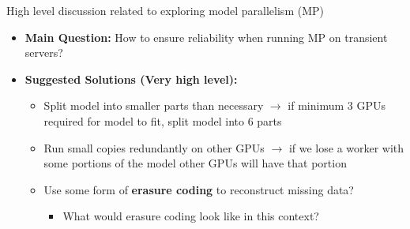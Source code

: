 \vspace{1em}
High level discussion related to exploring model parallelism (MP)
\begin{itemize}
    \item \textbf{Main Question:} How to ensure reliability when running MP on
      transient servers?
    \item \textbf{Suggested Solutions (Very high level):}
    \begin{itemize}
        \item Split model into smaller parts than necessary $\rightarrow$
          if minimum 3 GPUs required for model to fit, split model into 6 parts
        \item Run small copies redundantly on other GPUs $\rightarrow$ if we
          lose a worker with some portions of the model other GPUs will have that
          portion
        \item Use some form of \textbf{erasure coding} to reconstruct missing data?
        \begin{itemize}
            \item What would erasure coding look like in this context?
        \end{itemize}
    \end{itemize}
\end{itemize}
